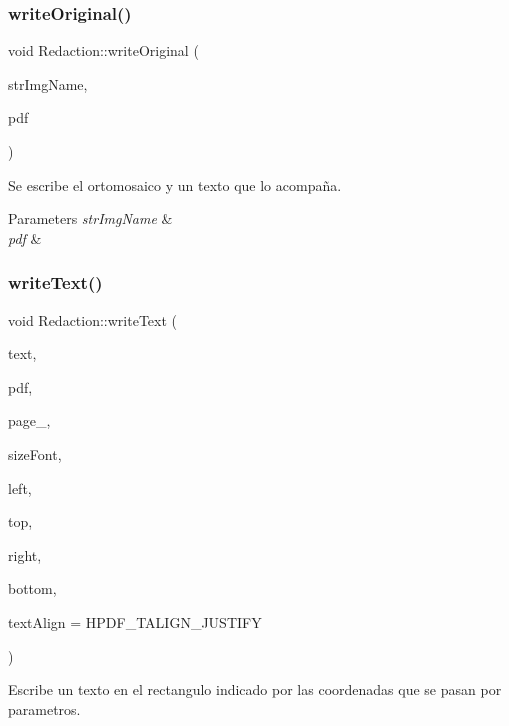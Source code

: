\subsubsection{\texorpdfstring{write\+Original()}{writeOriginal()}}
{\footnotesize\ttfamily void Redaction\+::write\+Original (\begin{DoxyParamCaption}\item[{string}]{str\+Img\+Name,  }\item[{H\+P\+D\+F\+\_\+\+Doc}]{pdf }\end{DoxyParamCaption})\hspace{0.3cm}{\ttfamily [inline]}}



Se escribe el ortomosaico y un texto que lo acompaña. 


\begin{DoxyParams}{Parameters}
{\em str\+Img\+Name} & \\
\hline
{\em pdf} & \\
\hline
\end{DoxyParams}
\mbox{\label{classRedaction_ab5716b51790373ff2726286e1d02d73d}} 
\subsubsection{\texorpdfstring{write\+Text()}{writeText()}}
{\footnotesize\ttfamily void Redaction\+::write\+Text (\begin{DoxyParamCaption}\item[{string}]{text,  }\item[{H\+P\+D\+F\+\_\+\+Doc}]{pdf,  }\item[{H\+P\+D\+F\+\_\+\+Page}]{page\+\_,  }\item[{int}]{size\+Font,  }\item[{int}]{left,  }\item[{int}]{top,  }\item[{int}]{right,  }\item[{int}]{bottom,  }\item[{H\+P\+D\+F\+\_\+\+Text\+Alignment}]{text\+Align = {\ttfamily HPDF\+\_\+TALIGN\+\_\+JUSTIFY} }\end{DoxyParamCaption})\hspace{0.3cm}{\ttfamily [inline]}}



Escribe un texto en el rectangulo indicado por las coordenadas que se pasan por parametros. 



